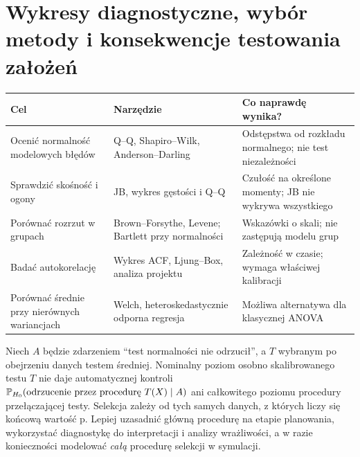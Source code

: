 \section{Wykresy diagnostyczne, wybór metody i konsekwencje testowania założeń}
\begin{center}
\end{center}

\begin{center}\small
\begin{tabular}{>{\raggedright\arraybackslash}p{}>{\raggedright\arraybackslash}p{}>{\raggedright\arraybackslash}p{}}
\toprule
\textbf{Cel} & \textbf{Narzędzie} & \textbf{Co naprawdę wynika?}\\
\midrule
Ocenić normalność modelowych błędów & Q--Q, Shapiro--Wilk, Anderson--Darling & Odstępstwa od rozkładu normalnego; nie test niezależności\\
Sprawdzić skośność i ogony & JB, wykres gęstości i Q--Q & Czułość na określone momenty; JB nie wykrywa wszystkiego\\
Porównać rozrzut w grupach & Brown--Forsythe, Levene; Bartlett przy normalności & Wskazówki o skali; nie zastępują modelu grup\\
Badać autokorelację & Wykres ACF, Ljung--Box, analiza projektu & Zależność w czasie; wymaga właściwej kalibracji\\
Porównać średnie przy nierównych wariancjach & Welch, heteroskedastycznie odporna regresja & Możliwa alternatywa dla klasycznej ANOVA\\
\bottomrule
\end{tabular}
\end{center}

\begin{uwaga}\label{rem:pretest}
Niech $A$ będzie zdarzeniem ``test normalności nie odrzucił'', a $T$ wybranym po obejrzeniu danych testem średniej. Nominalny poziom osobno skalibrowanego testu $T$ nie daje automatycznej kontroli $\mathbb P_{H_0}(\text{odrzucenie przez procedurę }T(X)\mid A)$ ani całkowitego poziomu procedury przełączającej testy. Selekcja zależy od tych samych danych, z których liczy się końcową wartość p. Lepiej uzasadnić główną procedurę na etapie planowania, wykorzystać diagnostykę do interpretacji i analizy wrażliwości, a w razie konieczności modelować \emph{całą} procedurę selekcji w symulacji.
\end{uwaga}

